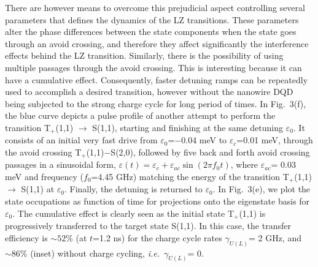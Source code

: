 \documentclass[prb,twocolumn,showpacs,floats]{revtex4}
\begin{document}
There are however means to overcome this prejudicial aspect controlling
several parameters that defines the dynamics of the LZ transitions.
These parameters alter the phase differences between
the state components when the state goes through an avoid crossing,
and therefore they affect significantly the interference effects behind the LZ transition. 
Similarly, there is the possibility of using multiple passages through the avoid crossing.
This is interesting because it can have a cumulative effect. Consequently, faster detuning ramps
can be repeatedly used to accomplish a desired transition, however
without the nanowire DQD being subjected to the strong charge cycle for long period of times.
In Fig.~3(f), the blue curve depicts a pulse profile of another attempt to perform 
the transition T$_+$(1,1) $\rightarrow$ S(1,1),
starting and finishing at the same detuning $\varepsilon_0$. It consists
of an initial very fast drive from $\varepsilon_0$=$-$0.04 meV to $\varepsilon_c$=0.01 meV, through the
avoid crossing T$_+$(1,1)$-$S(2,0), followed by five back and forth  avoid crossing passages in
a sinusoidal form, $\varepsilon(t)=\varepsilon_c+\varepsilon_{ac} \sin (2\pi f_0 t)$, 
where $\varepsilon_{ac}$= 0.03 meV and frequency ($f_0$=4.45 GHz) matching the 
energy of the transition T$_+$(1,1) $\rightarrow$ S(1,1) at $\varepsilon_0$.
Finally, the detuning is returned to $\varepsilon_0$.
In Fig.~3(e), we plot the state occupations as function of time for
projections onto the eigenstate basis for  $\varepsilon_0$.
The cumulative effect is clearly seen as the initial state T$_+$(1,1)
is progressively transferred to the target state S(1,1). In this case,
the transfer efficiency is $\sim 52\%$ (at $t$=1.2 ns) for the charge cycle rates
$\gamma_{U(L)}$= 2 GHz, and $\sim 86\%$ (inset)
without charge cycling, \textit{i.e.}~$\gamma_{U(L)}$= 0.
\end{document}
